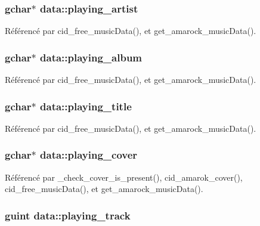 \subsubsection{\setlength{\rightskip}{0pt plus 5cm}gchar$\ast$ {\bf data::playing\_\-artist}}\label{structdata_3943a57791ed0358ba06f5a122a0bf02}




Référencé par cid\_\-free\_\-musicData(), et get\_\-amarock\_\-musicData().
\subsubsection{\setlength{\rightskip}{0pt plus 5cm}gchar$\ast$ {\bf data::playing\_\-album}}\label{structdata_6e4bc7f51a2d088999b6d43c0e768959}




Référencé par cid\_\-free\_\-musicData(), et get\_\-amarock\_\-musicData().
\subsubsection{\setlength{\rightskip}{0pt plus 5cm}gchar$\ast$ {\bf data::playing\_\-title}}\label{structdata_44a7d44e6cae021c6a65a4f1a1cc7b66}




Référencé par cid\_\-free\_\-musicData(), et get\_\-amarock\_\-musicData().
\subsubsection{\setlength{\rightskip}{0pt plus 5cm}gchar$\ast$ {\bf data::playing\_\-cover}}\label{structdata_84654f47f1d1155a1bb1b2a075052812}




Référencé par \_\-check\_\-cover\_\-is\_\-present(), cid\_\-amarok\_\-cover(), cid\_\-free\_\-musicData(), et get\_\-amarock\_\-musicData().
\subsubsection{\setlength{\rightskip}{0pt plus 5cm}guint {\bf data::playing\_\-track}}\label{structdata_ab1853f4c3a9b3fb2dcda59ada1fcb6e}




